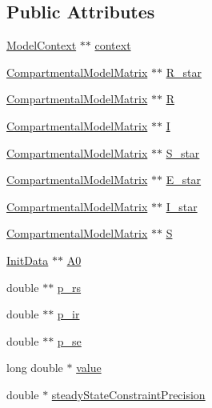 \subsection*{Public Attributes}
\begin{DoxyCompactItemize}
\item 
\hyperlink{classSpatialSEIR_1_1ModelContext}{Model\-Context} $\ast$$\ast$ \hyperlink{classSpatialSEIR_1_1FC__R__Star_ad6f46a048b0ba6b67ccde15d06ed489c}{context}
\item 
\hyperlink{classSpatialSEIR_1_1CompartmentalModelMatrix}{Compartmental\-Model\-Matrix} $\ast$$\ast$ \hyperlink{classSpatialSEIR_1_1FC__R__Star_ae4c0796d43a30d3cd2012cf53efd4b54}{R\-\_\-star}
\item 
\hyperlink{classSpatialSEIR_1_1CompartmentalModelMatrix}{Compartmental\-Model\-Matrix} $\ast$$\ast$ \hyperlink{classSpatialSEIR_1_1FC__R__Star_aaa850a4ce86274b47873855403b89a60}{R}
\item 
\hyperlink{classSpatialSEIR_1_1CompartmentalModelMatrix}{Compartmental\-Model\-Matrix} $\ast$$\ast$ \hyperlink{classSpatialSEIR_1_1FC__R__Star_a469dfad50afd14f2c0d31e0fa2251b07}{I}
\item 
\hyperlink{classSpatialSEIR_1_1CompartmentalModelMatrix}{Compartmental\-Model\-Matrix} $\ast$$\ast$ \hyperlink{classSpatialSEIR_1_1FC__R__Star_ab3302788df387cf8c27a0cb5b6e6af7e}{S\-\_\-star}
\item 
\hyperlink{classSpatialSEIR_1_1CompartmentalModelMatrix}{Compartmental\-Model\-Matrix} $\ast$$\ast$ \hyperlink{classSpatialSEIR_1_1FC__R__Star_a6c0332fc6048b76c493aa6f39ece5b76}{E\-\_\-star}
\item 
\hyperlink{classSpatialSEIR_1_1CompartmentalModelMatrix}{Compartmental\-Model\-Matrix} $\ast$$\ast$ \hyperlink{classSpatialSEIR_1_1FC__R__Star_a09d61de6e39bcfd4ff2e899c19670d55}{I\-\_\-star}
\item 
\hyperlink{classSpatialSEIR_1_1CompartmentalModelMatrix}{Compartmental\-Model\-Matrix} $\ast$$\ast$ \hyperlink{classSpatialSEIR_1_1FC__R__Star_a5a1c636b2e4f98eb690a4cc229bd97dc}{S}
\item 
\hyperlink{classSpatialSEIR_1_1InitData}{Init\-Data} $\ast$$\ast$ \hyperlink{classSpatialSEIR_1_1FC__R__Star_adfe19f14b5c9de7e7ed78ab81351db8e}{A0}
\item 
double $\ast$$\ast$ \hyperlink{classSpatialSEIR_1_1FC__R__Star_a66b5ad04a930d04074ebce5c89cec124}{p\-\_\-rs}
\item 
double $\ast$$\ast$ \hyperlink{classSpatialSEIR_1_1FC__R__Star_ae940ad3ed88ec011e9fecd7de3fc8864}{p\-\_\-ir}
\item 
double $\ast$$\ast$ \hyperlink{classSpatialSEIR_1_1FC__R__Star_a86cece0c58f44462b0f553bf7c8b8af6}{p\-\_\-se}
\item 
long double $\ast$ \hyperlink{classSpatialSEIR_1_1FC__R__Star_ab7dbeeefaeeafdf681e13f19e50055c3}{value}
\item 
double $\ast$ \hyperlink{classSpatialSEIR_1_1FC__R__Star_a495244734c4c39dc118ceef404062c70}{steady\-State\-Constraint\-Precision}
\end{DoxyCompactItemize}


